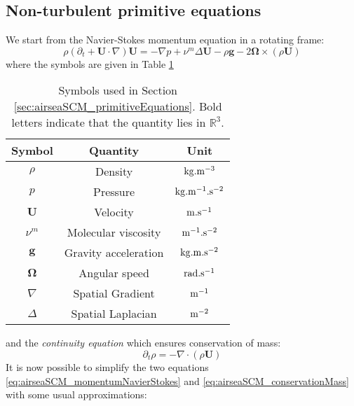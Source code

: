 \subsection{Non-turbulent primitive equations}
We start from the Navier-Stokes momentum equation in a rotating frame:
\begin{equation}
\label{eq:airseaSCM_momentumNavierStokes}
\rho \left(\partial_t + \mathbf{U} \cdot \nabla \right) \mathbf{U}
= - \nabla p + \nu^m \Delta \mathbf{U} - \rho \mathbf{g}
- 2 \mathbf{\Omega} \times (\rho \mathbf{U})
\end{equation}
where the symbols are given in Table
\ref{tab:airseaSCM_primitiveEquationsSymbols}
\begin{table}
\centering
\begin{tabular}{c|c|c}
Symbol & Quantity & Unit \\
\hline
$\rho$& {Density} & ${\rm kg}.{\rm m}^{-3}$ \\
$p$   & {Pressure} & ${\rm kg}.{\rm m}^{-1}.{\rm s}^{-2}$ \\
$\mathbf{U}$ & {Velocity}& ${\rm m}.{\rm s}^{-1}$ \\
$\nu^m$ & {Molecular viscosity}& ${\rm m}^{-1}.{\rm s}^{-2}$ \\
$\mathbf{g}$ & {Gravity acceleration}& ${\rm kg}.{\rm m}.{\rm s}^{-2}$ \\
$\mathbf{\Omega}$ & {Angular speed}& ${\rm rad}.{\rm s}^{-1}$ \\
$\nabla$ & {Spatial Gradient} & ${\rm m}^{-1}$\\
$\Delta$ & {Spatial Laplacian} &${\rm m}^{-2}$
\end{tabular}
\caption{Symbols used in Section
\ref{sec:airseaSCM_primitiveEquations}. Bold letters
indicate that the quantity lies in $\mathbb{R}^3$.}
\label{tab:airseaSCM_primitiveEquationsSymbols}
\end{table}
and the \textit{continuity equation} which ensures
conservation of mass:
\begin{equation}
\label{eq:airseaSCM_conservationMass}
\partial_t \rho = - \nabla \cdot (\rho \mathbf{U})
\end{equation}
It is now possible to simplify the two equations
\eqref{eq:airseaSCM_momentumNavierStokes} and
\eqref{eq:airseaSCM_conservationMass} with
some usual approximations:
